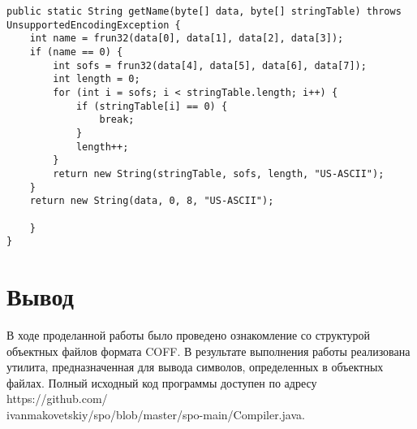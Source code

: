 \begin{Verbatim}
public static String getName(byte[] data, byte[] stringTable) throws UnsupportedEncodingException {
	int name = frun32(data[0], data[1], data[2], data[3]);
	if (name == 0) {
		int sofs = frun32(data[4], data[5], data[6], data[7]);
		int length = 0;
		for (int i = sofs; i < stringTable.length; i++) {
			if (stringTable[i] == 0) {
				break;
			}
			length++;
		}
		return new String(stringTable, sofs, length, "US-ASCII");
	}
	return new String(data, 0, 8, "US-ASCII");

	}
}
\end{Verbatim}

\normalsize

\section{Вывод}

В ходе проделанной работы было проведено ознакомление со структурой объектных файлов формата COFF. В результате выполнения работы реализована утилита, предназначенная для вывода символов, определенных в объектных файлах. Полный исходный код программы доступен по адресу https://github.com/ \\ ivanmakovetskiy/spo/blob/master/spo-main/Compiler.java.
